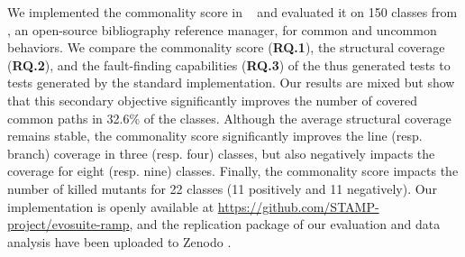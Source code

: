 We implemented the commonality score in \evosuite~\cite{Fraser2011} and evaluated it on 150 classes from \jabref, an open-source bibliography reference manager, for common and uncommon behaviors. We compare the commonality score (\textbf{RQ.1}), the structural coverage (\textbf{RQ.2}), and the fault-finding capabilities (\textbf{RQ.3}) of the thus generated tests to tests generated by the standard \evosuite implementation. Our results are mixed but show that this secondary objective significantly improves the number of covered common paths in 32.6\% of the classes. 
Although the average structural coverage remains stable, the commonality score significantly improves the line (resp. branch) coverage in three (resp. four) classes, but also negatively impacts the coverage for eight (resp. nine) classes. Finally, the commonality score impacts the number of killed mutants for 22 classes (11 positively and 11 negatively).
%
Our implementation is openly available at \url{https://github.com/STAMP-project/evosuite-ramp}, and the replication package of our evaluation and data analysis have been uploaded to Zenodo \cite{evers_bjorn_2020_3897513, evers_bjorn_2020_3894711}. 




